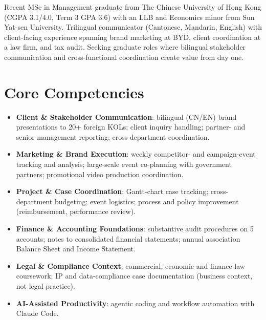 \documentclass[11pt,a4paper,sans]{moderncv}
\begin{document}
\makecvtitle


\vspace{6pt}
\small{Recent MSc in Management graduate from The Chinese University of Hong Kong (CGPA 3.1/4.0, Term 3 GPA 3.6) with an LLB and Economics minor from Sun Yat-sen University. Trilingual communicator (Cantonese, Mandarin, English) with client-facing experience spanning brand marketing at BYD, client coordination at a law firm, and tax audit. Seeking graduate roles where bilingual stakeholder communication and cross-functional coordination create value from day one.}


\section{Core Competencies}
\vspace{1pt}
\begin{itemize}

\item \textbf{Client \& Stakeholder Communication}: bilingual (CN/EN) brand presentations to 20+ foreign KOLs; client inquiry handling; partner- and senior-management reporting; cross-department coordination.

\item \textbf{Marketing \& Brand Execution}: weekly competitor- and campaign-event tracking and analysis; large-scale event co-planning with government partners; promotional video production coordination.

\item \textbf{Project \& Case Coordination}: Gantt-chart case tracking; cross-department budgeting; event logistics; process and policy improvement (reimbursement, performance review).

\item \textbf{Finance \& Accounting Foundations}: substantive audit procedures on 5 accounts; notes to consolidated financial statements; annual association Balance Sheet and Income Statement.

\item \textbf{Legal \& Compliance Context}: commercial, economic and finance law coursework; IP and data-compliance case documentation (business context, not legal practice).

\item \textbf{AI-Assisted Productivity}: agentic coding and workflow automation with Claude Code.

\end{itemize}
\end{document}
